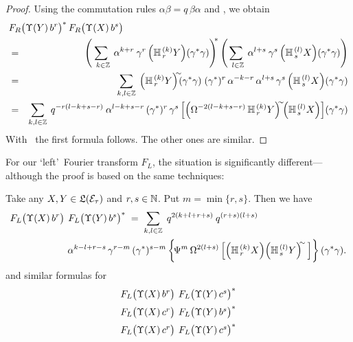 \begin{proof}
Using the commutation rules $\alpha\beta = q\,\beta\alpha$ and
\mbox{\cite[lemma 3.5.1.2]{Jeroen:QE2:haar}}, we obtain
\begin{eqnarray*}
\lefteqn{F_R\!\left(\Upsilon(Y)\, b^r \vertM\right)^*
         F_R\!\left(\Upsilon(X)\,b^s \vertM\right) }  \\
&=&
    \left(\sum_{\;\:k\in\ZZ} \: \alpha^{k+r} \: \gamma^r
          \left(\YaH{r}{k}Y\right)\!(\gamma^*\gamma)
    \right)^{\!\!*}
    \left(\sum_{\;\:l\in\ZZ} \: \alpha^{l+s} \: \gamma^s
          \left(\YaH{s}{l}X\right)\!(\gamma^*\gamma) \right)  \\
&=&
    \sum_{k,l\in\ZZ} \:
    \left(\YaH{r}{k}Y\right)^{\!\!\sim} \!\!\!(\gamma^*\gamma) \;
    (\gamma^*)^r \, \alpha^{-k-r} \, \alpha^{l+s} \, \gamma^s
          \left(\YaH{s}{l}X\right)\!(\gamma^*\gamma) \\
&=&
    \sum_{k,l\in\ZZ} \: q^{-r(l-k+s-r)} \: \alpha^{l-k+s-r} \,
    (\gamma^*)^r  \, \gamma^s
    \left[ \left(\Omega^{-2(l-k+s-r)}\, \YaH{r}{k}Y\right)^{\!\!\sim} \!\!
           \left(\YaH{s}{l}X\right)
    \right]   \!(\gamma^*\gamma)
\end{eqnarray*}
With \mbox{\cite[lemma 3.5.1.2]{Jeroen:QE2:haar}}\ the first formula follows.
The other ones are similar.
\end{proof}

\vspace{1ex}
For our \lq left\rq\ Fourier transform $F_L$, the situation is significantly
different---although the proof is based on the same techniques:
\begin{lemma} \label{lemma:pre_plancherel:left}
Take any $X,Y\in\mathfrak{L}(\mathcal E_\tau)$ and $r, s \in \mathbb{N}$. Put $m=\min\{r,s\}$.
Then we have
\begin{eqnarray*}
\lefteqn{F_L\! \left(\Upsilon(X)\, b^r \vertM\right) \:
         F_L\! \left(\Upsilon(Y)\, b^s \vertM\right)^*
\;=\;
               \sum_{k,l\in\ZZ}  \; q^{2(k+l+r+s)} \: q^{(r+s)(l+s)}   }\\
& \hspace{5em} &
    \alpha^{k-l+r-s} \, \gamma^{r-m} \, (\gamma^*)^{s-m}  \left\{ \! \Psi^m \, \Omega^{2(l+s)}
    \left[ \left(\YaH{r}{k}X\right) \! \left(\YaH{s}{l}Y\right)^{\!\!\sim}\,
    \right] \vertXL \! \right\} (\gamma^*\gamma).
\end{eqnarray*}
and similar formulas for
$$ \begin{array}{l}
   F_L\! \left(\Upsilon(X)\, b^r \vertM\right) \:
   F_L\! \left(\Upsilon(Y)\, c^s \vertM\right)^*
\\ \vertXL
   F_L\! \left(\Upsilon(X)\, c^r \vertM\right) \:
   F_L\! \left(\Upsilon(Y)\, b^s \vertM\right)^*
\\ \vertXL
   F_L\! \left(\Upsilon(X)\, c^r \vertM\right) \:
   F_L\! \left(\Upsilon(Y)\, c^s \vertM\right)^*
\end{array} $$
\end{lemma}


